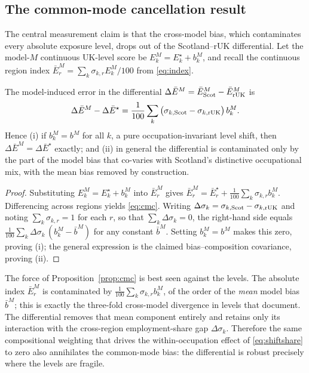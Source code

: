 \subsection{The common-mode cancellation result}

The central measurement claim is that the cross-model bias, which contaminates every absolute exposure level, drops out of the Scotland--rUK differential. Let the model-$M$ continuous UK-level score be $E^{M}_k=E^{\star}_k+b^{M}_k$, and recall the continuous region index $\bar E^{M}_r=\sum_k\sigma_{k,r}E^{M}_k/100$ from \eqref{eq:index}.

\begin{proposition}\label{prop:cmc}
The model-induced error in the differential $\Delta\bar E^{M}=\bar E^{M}_{\mathrm{Scot}}-\bar E^{M}_{\mathrm{rUK}}$ is
\begin{equation}
\Delta\bar E^{M}-\Delta\bar E^{\star}
=\frac{1}{100}\sum_k\big(\sigma_{k,\mathrm{Scot}}-\sigma_{k,\mathrm{rUK}}\big)\,b^{M}_k .
\label{eq:cmc}
\end{equation}
Hence (i) if $b^{M}_k=b^{M}$ for all $k$, a pure occupation-invariant level shift, then $\Delta\bar E^{M}=\Delta\bar E^{\star}$ exactly; and (ii) in general the differential is contaminated only by the part of the model bias that co-varies with Scotland's distinctive occupational mix, with the mean bias removed by construction.
\end{proposition}

\begin{proof}
Substituting $E^{M}_k=E^{\star}_k+b^{M}_k$ into $\bar E^{M}_r$ gives $\bar E^{M}_r=\bar E^{\star}_r+\tfrac{1}{100}\sum_k\sigma_{k,r}b^{M}_k$. Differencing across regions yields \eqref{eq:cmc}. Writing $\Delta\sigma_k=\sigma_{k,\mathrm{Scot}}-\sigma_{k,\mathrm{rUK}}$ and noting $\sum_k\sigma_{k,r}=1$ for each $r$, so that $\sum_k\Delta\sigma_k=0$, the right-hand side equals $\tfrac{1}{100}\sum_k\Delta\sigma_k\,(b^{M}_k-\bar b^{M})$ for any constant $\bar b^{M}$. Setting $b^{M}_k=b^{M}$ makes this zero, proving (i); the general expression is the claimed bias--composition covariance, proving (ii).
\end{proof}

The force of Proposition~\ref{prop:cmc} is best seen against the levels. The absolute index $\bar E^{M}_r$ is contaminated by $\tfrac{1}{100}\sum_k\sigma_{k,r}b^{M}_k$, of the order of the \emph{mean} model bias $\bar b^{M}$; this is exactly the three-fold cross-model divergence in levels that \citet{yin2026} document. The differential removes that mean component entirely and retains only its interaction with the cross-region employment-share gap $\Delta\sigma_k$. Therefore the same compositional weighting that drives the within-occupation effect of \eqref{eq:shiftshare} to zero also annihilates the common-mode bias: the differential is robust precisely where the levels are fragile.

